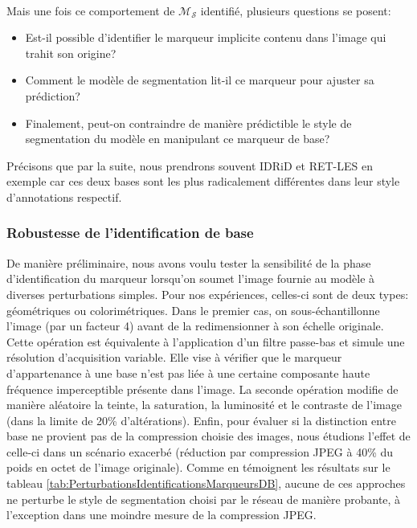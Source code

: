 \\
Mais une fois ce comportement de $\mathcal{M}_\mathcal{S}$ identifié, plusieurs questions se posent:
\begin{itemize}
	\item Est-il possible d'identifier le marqueur implicite contenu dans l'image qui trahit son origine?
	\item Comment le modèle de segmentation lit-il ce marqueur pour ajuster sa prédiction?
	\item Finalement, peut-on contraindre de manière prédictible le style de segmentation du modèle en manipulant ce marqueur de base?
\end{itemize}

Précisons que par la suite, nous prendrons souvent IDRiD et RET-LES en exemple car ces deux bases sont les plus radicalement différentes dans leur style d'annotations respectif.
\subsubsection{Robustesse de l'identification de base}
De manière préliminaire, nous avons voulu tester la sensibilité de la phase d'identification du marqueur lorsqu'on soumet l'image fournie au modèle à diverses perturbations simples. Pour nos expériences, celles-ci sont de deux types: géométriques ou colorimétriques. Dans le premier cas, on sous-échantillonne l'image (par un facteur 4) avant de la redimensionner à son échelle originale. Cette opération est équivalente à l'application d'un filtre passe-bas et simule une résolution d'acquisition variable. Elle vise à vérifier que le marqueur d'appartenance à une base n'est pas liée à une certaine composante haute fréquence imperceptible présente dans l'image. La seconde opération modifie de manière aléatoire la teinte, la saturation, la luminosité et le contraste de l'image (dans la limite de 20\% d'altérations). Enfin, pour évaluer si la distinction entre base ne provient pas de la compression choisie des images, nous étudions l'effet de celle-ci dans un scénario exacerbé (réduction par compression JPEG à 40\% du poids en octet de l'image originale). Comme en témoignent les résultats sur le tableau \ref{tab:PerturbationsIdentificationsMarqueursDB}, aucune de ces approches ne perturbe le style de segmentation choisi par le réseau de manière probante, à l'exception dans une moindre mesure de la compression JPEG.

